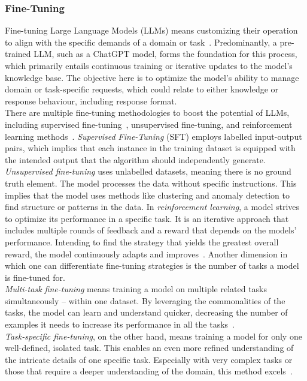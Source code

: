 \subsubsection*{Fine-Tuning}\label{sec:fine-tuning-def}
Fine-tuning Large Language Models (LLMs) means customizing their operation to align with the specific demands of a domain or task~\cite{ovadia_fine-tuning_2024}. Predominantly, a pre-trained LLM, such as a ChatGPT model, forms the foundation for this process, which primarily entails continuous training or iterative updates to the model's knowledge base. The objective here is to optimize the model's ability to manage domain or task-specific requests, which could relate to either knowledge or response behaviour, including response format.\\
There are multiple fine-tuning methodologies to boost the potential of LLMs, including supervised fine-tuning~\cite{zhou_enhancing_2024}, unsupervised fine-tuning, and reinforcement learning methods~\cite{touvron_llama_2023}. \emph{Supervised Fine-Tuning} (SFT) employs labelled input-output pairs, which implies that each instance in the training dataset is equipped with the intended output that the algorithm should independently generate. \emph{Unsupervised fine-tuning} uses unlabelled datasets, meaning there is no ground truth element. The model processes the data without specific instructions. This implies that the model uses methods like clustering and anomaly detection to find structure or patterns in the data. In \emph{reinforcement learning}, a model strives to optimize its performance in a specific task. It is an iterative approach that includes multiple rounds of feedback and a reward that depends on the models' performance. Intending to find the strategy that yields the greatest overall reward, the model continuously adapts and improves~\cite{ovadia_fine-tuning_2024}.
Another dimension in which one can differentiate fine-tuning strategies is the number of tasks a model is fine-tuned for.\\
\emph{Multi-task fine-tuning} means training a model on multiple related tasks simultaneously – within one dataset. By leveraging the commonalities of the tasks, the model can learn and understand quicker, decreasing the number of examples it needs to increase its performance in all the tasks~\cite{pilault_conditionally_2020}.\\
\emph{Task-specific fine-tuning}, on the other hand, means training a model for only one well-defined, isolated task. This enables an even more refined understanding of the intricate details of one specific task. Especially with very complex tasks or those that require a deeper understanding of the domain, this method excels~\cite{xinxi_single_2021}.

